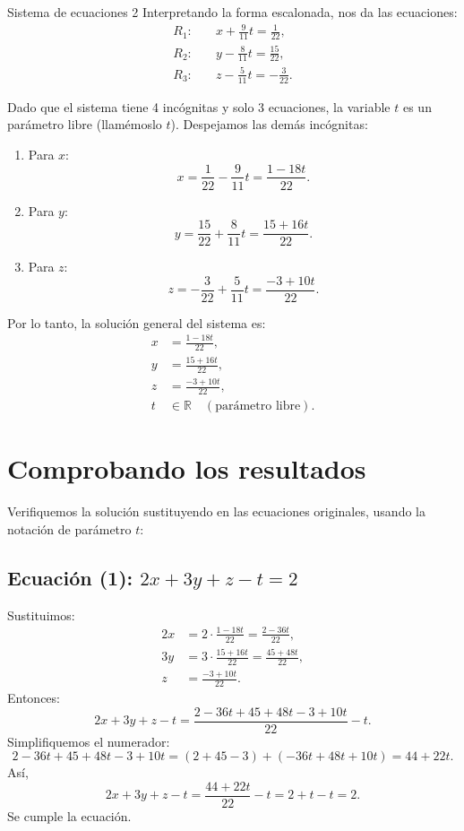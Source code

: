 \documentclass[11pt,letterpaper]{article}
\begin{document}
\begin{inciso}{Sistema de ecuaciones 2}
Interpretando la forma escalonada, nos da las ecuaciones:
\[
\begin{aligned}
R_1:\quad & x + \frac{9}{11}t = \frac{1}{22}, \\[1mm]
R_2:\quad & y - \frac{8}{11}t = \frac{15}{22}, \\[1mm]
R_3:\quad & z - \frac{5}{11}t = -\frac{3}{22}.
\end{aligned}
\]

Dado que el sistema tiene 4 incógnitas y solo 3 ecuaciones, la variable \(t\) es un parámetro libre (llamémoslo \(t\)). Despejamos las demás incógnitas:

\begin{enumerate}
    \item Para \(x\):
       \[
       x = \frac{1}{22} - \frac{9}{11}t = \frac{1 - 18t}{22}.
       \]
    \item Para \(y\):
       \[
       y = \frac{15}{22} + \frac{8}{11}t = \frac{15 + 16t}{22}.
       \]
    \item Para \(z\):
       \[
       z = -\frac{3}{22} + \frac{5}{11}t = \frac{-3 + 10t}{22}.
       \] 
\end{enumerate}


Por lo tanto, la solución general del sistema es:
\[
\boxed{
\begin{aligned}
x &= \frac{1 - 18t}{22},\\[1mm]
y &= \frac{15 + 16t}{22},\\[1mm]
z &= \frac{-3 + 10t}{22},\\[1mm]
t &\in \mathbb{R}\quad (\text{parámetro libre}).
\end{aligned}
}
\]

\section*{Comprobando los resultados}

Verifiquemos la solución sustituyendo en las ecuaciones originales, usando la notación de parámetro \(t\):

\subsection*{Ecuación (1): \(2x + 3y + z - t = 2\)}

Sustituimos:
\[
\begin{aligned}
2x &= 2\cdot\frac{1 - 18t}{22} = \frac{2 - 36t}{22},\\[1mm]
3y &= 3\cdot\frac{15 + 16t}{22} = \frac{45 + 48t}{22},\\[1mm]
z &= \frac{-3 + 10t}{22}.
\end{aligned}
\]
Entonces:
\[
2x + 3y + z - t = \frac{2 - 36t + 45 + 48t - 3 + 10t}{22} - t.
\]
Simplifiquemos el numerador:
\[
2 - 36t + 45 + 48t - 3 + 10t = (2+45-3) + (-36t+48t+10t) = 44 + 22t.
\]
Así,
\[
2x + 3y + z - t = \frac{44 + 22t}{22} - t = 2 + t - t = 2.
\]
Se cumple la ecuación.


\end{inciso}
\end{document}
